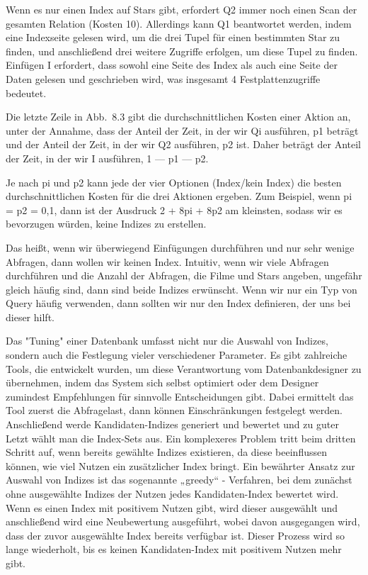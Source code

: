 Wenn es nur einen Index auf Stars gibt, erfordert Q2 immer noch einen Scan der gesamten Relation (Kosten 10).
Allerdings kann Q1 beantwortet werden, indem eine Indexseite gelesen wird, um die drei Tupel für einen bestimmten Star zu finden, und anschließend drei weitere Zugriffe erfolgen, um diese Tupel zu finden.
Einfügen I erfordert, dass sowohl eine Seite des Index als auch eine Seite der Daten gelesen und geschrieben wird, was insgesamt 4 Festplattenzugriffe bedeutet.

Die letzte Zeile in Abb.\ 8.3 gibt die durchschnittlichen Kosten einer Aktion an, unter der Annahme, dass der Anteil der Zeit, in der wir Qi ausführen, p1 beträgt und der Anteil der Zeit, in der wir Q2 ausführen, p2 ist.
Daher beträgt der Anteil der Zeit, in der wir I ausführen, 1 — p1 — p2.

Je nach pi und p2 kann jede der vier Optionen (Index/kein Index) die besten durchschnittlichen Kosten für die drei Aktionen ergeben.
Zum Beispiel, wenn pi = p2 = 0,1, dann ist der Ausdruck 2 + 8pi + 8p2 am kleinsten, sodass wir es bevorzugen würden, keine Indizes zu erstellen.

Das heißt, wenn wir überwiegend Einfügungen durchführen und nur sehr wenige Abfragen, dann wollen wir keinen Index.
Intuitiv, wenn wir viele Abfragen durchführen und die Anzahl der Abfragen, die Filme und Stars angeben, ungefähr gleich häufig sind, dann sind beide Indizes erwünscht.
Wenn wir nur ein Typ von Query häufig verwenden, dann sollten wir nur den Index definieren, der uns bei dieser hilft.

Das "Tuning" einer Datenbank umfasst nicht nur die Auswahl von Indizes, sondern auch die Festlegung vieler verschiedener Parameter.
Es gibt zahlreiche Tools, die entwickelt wurden, um diese Verantwortung vom Datenbankdesigner zu übernehmen, indem das System sich selbst optimiert oder dem Designer zumindest Empfehlungen für sinnvolle Entscheidungen gibt.
Dabei ermittelt das Tool zuerst die Abfragelast, dann können Einschränkungen festgelegt werden.
Anschließend werde Kandidaten-Indizes generiert und bewertet und zu guter Letzt wählt man die Index-Sets aus.
Ein komplexeres Problem tritt beim dritten Schritt auf, wenn bereits gewählte Indizes existieren, da diese beeinflussen können, wie viel Nutzen ein zusätzlicher Index bringt.
Ein bewährter Ansatz zur Auswahl von Indizes ist das sogenannte „greedy“ - Verfahren, bei dem zunächst ohne ausgewählte Indizes der Nutzen jedes Kandidaten-Index bewertet wird.
Wenn es einen Index mit positivem Nutzen gibt, wird dieser ausgewählt und anschließend wird eine Neubewertung ausgeführt, wobei davon ausgegangen wird, dass der zuvor ausgewählte Index bereits verfügbar ist.
Dieser Prozess wird so lange wiederholt, bis es keinen Kandidaten-Index mit positivem Nutzen mehr gibt.


